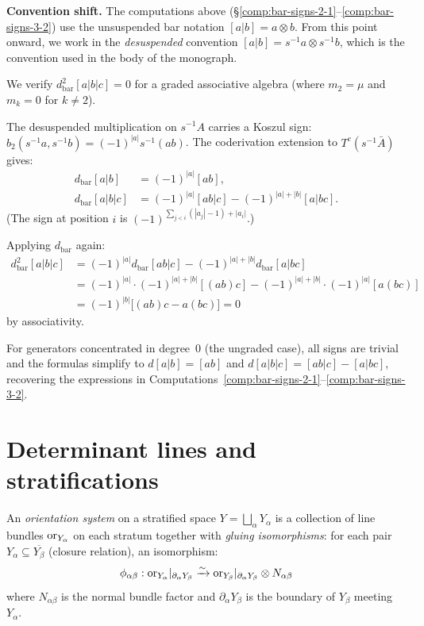 \medskip
\noindent\textbf{Convention shift.}  The computations above (\S\ref{comp:bar-signs-2-1}--\ref{comp:bar-signs-3-2}) use the unsuspended bar notation $[a|b] = a \otimes b$.  From this point onward, we work in the \emph{desuspended} convention $[a|b] = s^{-1}a \otimes s^{-1}b$, which is the convention used in the body of the monograph.

\begin{verification}[\texorpdfstring{$d^2 = 0$}{d\textasciicircum 2 = 0} check at degree 3]
\label{ver:d2-degree3}
We verify $d_{\mathrm{bar}}^2[a|b|c] = 0$ for a graded associative algebra
(where $m_2 = \mu$ and $m_k = 0$ for $k \neq 2$).

The desuspended multiplication on $s^{-1}A$ carries a Koszul sign:
$b_2(s^{-1}a, s^{-1}b) = (-1)^{|a|} s^{-1}(ab)$.  The coderivation extension
to $T^c(s^{-1}\bar{A})$ gives:
\begin{align*}
d_{\mathrm{bar}}[a|b] &= (-1)^{|a|}[ab], \\
d_{\mathrm{bar}}[a|b|c] &= (-1)^{|a|}[ab|c] - (-1)^{|a|+|b|}[a|bc].
\end{align*}
(The sign at position $i$ is $(-1)^{\sum_{j<i}(|a_j|-1) + |a_i|}$.)

Applying $d_{\mathrm{bar}}$ again:
\begin{align*}
d_{\mathrm{bar}}^2[a|b|c] &= (-1)^{|a|} d_{\mathrm{bar}}[ab|c]
    - (-1)^{|a|+|b|} d_{\mathrm{bar}}[a|bc] \\
&= (-1)^{|a|} \cdot (-1)^{|a|+|b|} [(ab)c]
    - (-1)^{|a|+|b|} \cdot (-1)^{|a|} [a(bc)] \\
&= (-1)^{|b|}\bigl[(ab)c - a(bc)\bigr] = 0
\end{align*}
by associativity.

\begin{remark}
For generators concentrated in degree~0 (the ungraded case), all signs are
trivial and the formulas simplify to $d[a|b] = [ab]$ and
$d[a|b|c] = [ab|c] - [a|bc]$, recovering the expressions in
Computations~\ref{comp:bar-signs-2-1}--\ref{comp:bar-signs-3-2}.
\end{remark}
\end{verification}


\section{Determinant lines and stratifications}
\label{sec:det-strat}

\begin{definition}
\label{def:orientation-system}
An \emph{orientation system} on a stratified space $Y = \bigsqcup_\alpha Y_\alpha$ 
is a collection of line bundles $\mathrm{or}_{Y_\alpha}$ on each stratum together with 
\emph{gluing isomorphisms}: for each pair $Y_\alpha \subseteq \overline{Y_\beta}$ 
(closure relation), an isomorphism:
\[
\phi_{\alpha\beta}: \mathrm{or}_{Y_\alpha}|_{\partial_\alpha Y_\beta} \xrightarrow{\sim} 
\mathrm{or}_{Y_\beta}|_{\partial_\alpha Y_\beta} \otimes N_{\alpha\beta}
\]
where $N_{\alpha\beta}$ is the normal bundle factor and $\partial_\alpha Y_\beta$ 
is the boundary of $Y_\beta$ meeting $Y_\alpha$.
\end{definition}

